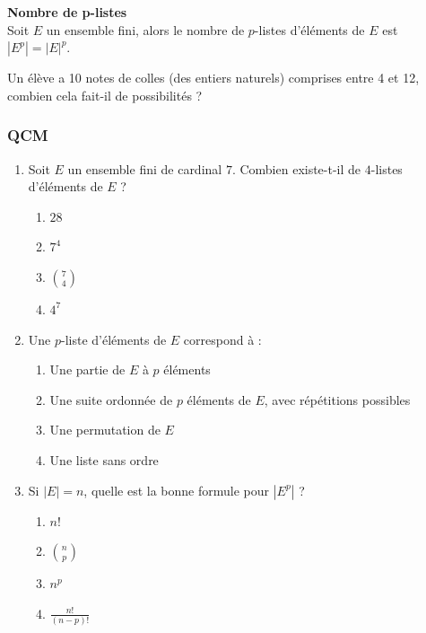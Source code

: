 \documentclass[../PolyS4.tex]{subfiles}
\begin{document}
\begin{Prop}\textbf{Nombre de p-listes} \\
 Soit \( E \) un ensemble fini, alors le nombre de \( p \)-listes d'éléments de \( E \) est \( |E^p| = |E|^p \).
 \end{Prop}



\begin{Ex} Un élève a 10 notes de colles (des entiers naturels) comprises entre 4 et 12, combien cela fait-il de possibilités ?\\
\end{Ex}

\subsubsection*{QCM}

\begin{enumerate}
\item Soit $E$ un ensemble fini de cardinal $7$. Combien existe-t-il de $4$-listes d'éléments de $E$ ?
\begin{enumerate}
\item $28$
\item $7^4$
\item $\binom{7}{4}$
\item $4^7$
\end{enumerate}

\newpage

\item Une $p$-liste d'éléments de $E$ correspond à :
\begin{enumerate}
\item Une partie de $E$ à $p$ éléments
\item Une suite ordonnée de $p$ éléments de $E$, avec répétitions possibles
\item Une permutation de $E$
\item Une liste sans ordre
\end{enumerate}

\item Si $|E| = n$, quelle est la bonne formule pour $|E^p|$ ?
\begin{enumerate}
\item $n!$
\item $\binom{n}{p}$
\item $n^p$
\item $\frac{n!}{(n-p)!}$
\end{enumerate}
\end{enumerate}
\end{document}
